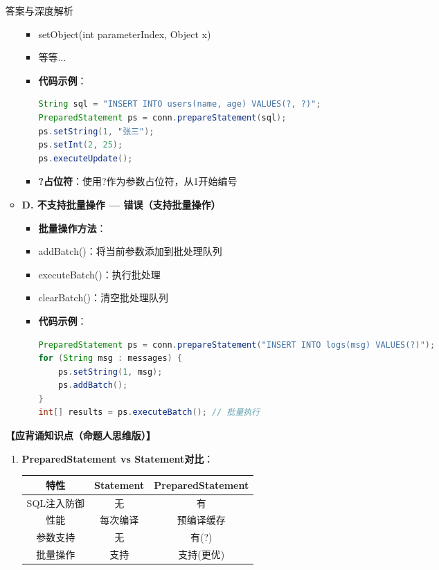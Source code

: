 \documentclass[12pt, a4paper]{ctexart}
\begin{document}
\begin{enumerate}[label=\textbf{\arabic*.}]
\begin{bluebox}{答案与深度解析}
\begin{itemize}[label={}, leftmargin=*, nosep]
\begin{itemize}[label={}, nosep]
				            \item setObject(int parameterIndex, Object x)
				            \item 等等...
			      \item \textbf{代码示例}：
			            \begin{lstlisting}[language=Java]
String sql = "INSERT INTO users(name, age) VALUES(?, ?)";
PreparedStatement ps = conn.prepareStatement(sql);
ps.setString(1, "张三");
ps.setInt(2, 25);
ps.executeUpdate();
      \end{lstlisting}
			      \item \textbf{?占位符}：使用?作为参数占位符，从1开始编号
					  \end{itemize}
		      \item \textbf{D. 不支持批量操作 — 错误（支持批量操作）}
					  \begin{itemize}[label={}, nosep]
			      \item \textbf{批量操作方法}：
				            \item addBatch()：将当前参数添加到批处理队列
				            \item executeBatch()：执行批处理
				            \item clearBatch()：清空批处理队列
			      \item \textbf{代码示例}：
			            \begin{lstlisting}[language=Java]
PreparedStatement ps = conn.prepareStatement("INSERT INTO logs(msg) VALUES(?)");
for (String msg : messages) {
    ps.setString(1, msg);
    ps.addBatch();
}
int[] results = ps.executeBatch(); // 批量执行
      \end{lstlisting}
					  \end{itemize}
					  \end{itemize}
\textbf{【应背诵知识点（命题人思维版）】}
		      \begin{enumerate}[label={}, leftmargin=*, nosep]
			      \item \textbf{PreparedStatement vs Statement对比}：
			            \begin{tabular}{|c|c|c|}
				            \hline
				            \textbf{特性} & \textbf{Statement} & \textbf{PreparedStatement} \\
				            \hline
				            SQL注入防御     & 无                  & 有                          \\
				            \hline
				            性能          & 每次编译               & 预编译缓存                      \\
				            \hline
				            参数支持        & 无                  & 有(?)                       \\
				            \hline
				            批量操作        & 支持                 & 支持(更优)                     \\
				            \hline
			            \end{tabular}


\end{enumerate}
\end{bluebox}
\end{enumerate}
\end{document}
